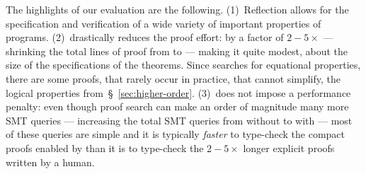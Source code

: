 %
The highlights of our evaluation are the following.
%
(1)~Reflection allows for the specification and verification
    of a wide variety of important properties of programs.
%
(2)~\pbesym drastically reduces the proof effort: by a factor
    of $2-5\times$ --- shrinking the total lines of
    proof from \lhproofstotal to \pbeproofstotal ---
    making it quite modest, about the size of
    the specifications of the theorems.
    Since \pbesym searches for equational
    properties, there are some proofs, that
    rarely occur in practice, that
    \pbesym cannot simplify, \eg the
    logical properties
    from~\S~\ref{sec:higher-order}.
%
(3)~\pbesym does not impose a performance penalty: even though
    proof search can make an order of magnitude many more SMT
    queries --- increasing the total SMT queries from
    \lhsmttotal without \pbesym to \pbesmttotal with \pbesym---
    most of these queries are simple and it is typically
    \emph{faster} to type-check the compact proofs enabled by
    \pbesym than it is to type-check the $2-5\times$ longer
    explicit proofs written by a human.

\begin{figure}[t!]

\end{figure}





